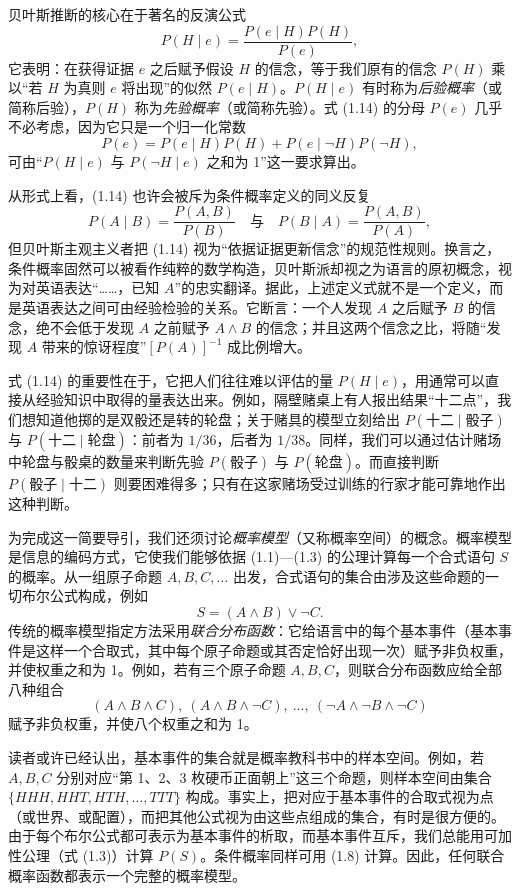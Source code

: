 贝叶斯推断的核心在于著名的反演公式
\begin{equation}
P(H\mid e) = \frac{P(e\mid H)P(H)}{P(e)}, \tag{1.14}
\end{equation}
它表明：在获得证据 $e$ 之后赋予假设 $H$ 的信念，等于我们原有的信念 $P(H)$ 乘以“若 $H$ 为真则 $e$ 将出现”的似然 $P(e\mid H)$。$P(H\mid e)$ 有时称为\emph{后验概率}（或简称后验），$P(H)$ 称为\emph{先验概率}（或简称先验）。式 \textup{(1.14)} 的分母 $P(e)$ 几乎不必考虑，因为它只是一个归一化常数
\[
P(e) = P(e\mid H)P(H) + P(e\mid\neg H)P(\neg H),
\]
可由“$P(H\mid e)$ 与 $P(\neg H\mid e)$ 之和为 1”这一要求算出。

从形式上看，\textup{(1.14)} 也许会被斥为条件概率定义的同义反复
\[
P(A\mid B) = \frac{P(A,B)}{P(B)} \quad\text{与}\quad P(B\mid A) = \frac{P(A,B)}{P(A)},
\]
但贝叶斯主观主义者把 \textup{(1.14)} 视为“依据证据更新信念”的规范性规则。换言之，条件概率固然可以被看作纯粹的数学构造，贝叶斯派却视之为语言的原初概念，视为对英语表达“……，已知 $A$”的忠实翻译。据此，上述定义式就不是一个定义，而是英语表达之间可由经验检验的关系。它断言：一个人发现 $A$ 之后赋予 $B$ 的信念，绝不会低于发现 $A$ 之前赋予 $A\wedge B$ 的信念；并且这两个信念之比，将随“发现 $A$ 带来的惊讶程度”$[P(A)]^{-1}$ 成比例增大。

式 \textup{(1.14)} 的重要性在于，它把人们往往难以评估的量 $P(H\mid e)$，用通常可以直接从经验知识中取得的量表达出来。例如，隔壁赌桌上有人报出结果“十二点”，我们想知道他掷的是双骰还是转的轮盘；关于赌具的模型立刻给出 $P(\text{十二}\mid\text{骰子})$ 与 $P(\text{十二}\mid\text{轮盘})$：前者为 $1/36$，后者为 $1/38$。同样，我们可以通过估计赌场中轮盘与骰桌的数量来判断先验 $P(\text{骰子})$ 与 $P(\text{轮盘})$。而直接判断 $P(\text{骰子}\mid\text{十二})$ 则要困难得多；只有在这家赌场受过训练的行家才能可靠地作出这种判断。

为完成这一简要导引，我们还须讨论\emph{概率模型}（又称概率空间）的概念。概率模型是信息的编码方式，它使我们能够依据 \textup{(1.1)}—\textup{(1.3)} 的公理计算每一个合式语句 $S$ 的概率。从一组原子命题 $A,B,C,\dots$ 出发，合式语句的集合由涉及这些命题的一切布尔公式构成，例如
\[
S = (A\wedge B)\vee\neg C .
\]
传统的概率模型指定方法采用\emph{联合分布函数}：它给语言中的每个基本事件（基本事件是这样一个合取式，其中每个原子命题或其否定恰好出现一次）赋予非负权重，并使权重之和为 1。例如，若有三个原子命题 $A,B,C$，则联合分布函数应给全部八种组合
\[
(A\wedge B\wedge C),\ (A\wedge B\wedge\neg C),\ \dots,\ (\neg A\wedge\neg B\wedge\neg C)
\]
赋予非负权重，并使八个权重之和为 1。

读者或许已经认出，基本事件的集合就是概率教科书中的样本空间。例如，若 $A,B,C$ 分别对应“第 1、2、3 枚硬币正面朝上”这三个命题，则样本空间由集合 $\{HHH,HHT,HTH,\dots,TTT\}$ 构成。事实上，把对应于基本事件的合取式视为点（或世界、或配置），而把其他公式视为由这些点组成的集合，有时是很方便的。由于每个布尔公式都可表示为基本事件的析取，而基本事件互斥，我们总能用可加性公理（式 \textup{(1.3)}）计算 $P(S)$。条件概率同样可用 \textup{(1.8)} 计算。因此，任何联合概率函数都表示一个完整的概率模型。

